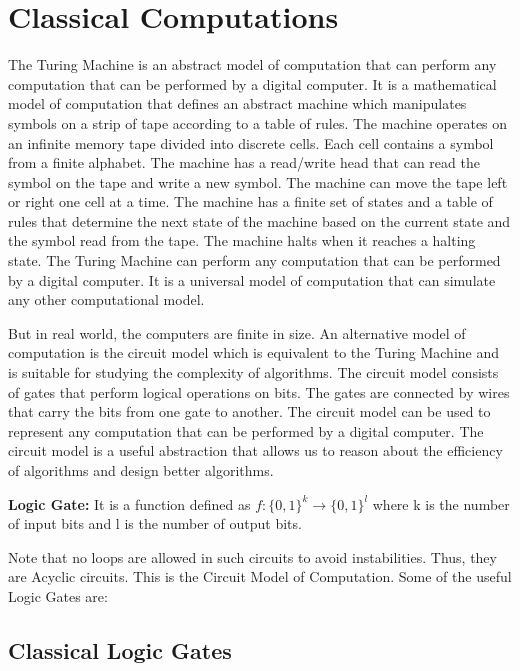 \chapter{Classical Computations}
The Turing Machine is an abstract model of computation that can perform any computation that can be performed by a digital computer. It is a mathematical model of computation that defines an abstract machine which manipulates symbols on a strip of tape according to a table of rules.
The machine operates on an infinite memory tape divided into discrete cells. Each cell contains a symbol from a finite alphabet. The machine has a read/write head that can read the symbol on the tape and write a new symbol. The machine can move the tape left or right one cell at a time. The machine has a finite set of states and a table of rules that determine the next state of the machine based on the current state and the symbol read from the tape. The machine halts when it reaches a halting state. The Turing Machine can perform any computation that can be performed by a digital computer. It is a universal 
model of computation that can simulate any other computational model.

But in real world, the computers are finite in size.
An alternative model of computation is the circuit model which is equivalent to the Turing Machine
and is suitable for studying the complexity of algorithms. The circuit model consists of gates that perform logical operations on bits. The gates are connected by wires that carry the bits from one gate to another. 
The circuit model can be used to represent any computation that can be performed by a 
digital computer. The circuit model is a useful abstraction that 
allows us to reason about the efficiency of algorithms and design better algorithms. 

\begin{definition}
\textbf{Logic Gate: }It is a function defined as $f:\{0,1\}^k \rightarrow \{0,1\}^l$ where k is the number of input bits and 
l is the number of output bits.
\end{definition}
Note that no loops are allowed in such circuits to avoid instabilities. Thus, they are Acyclic circuits.
This is the Circuit Model of Computation.
Some of the useful Logic Gates are:
\section{Classical Logic Gates}
